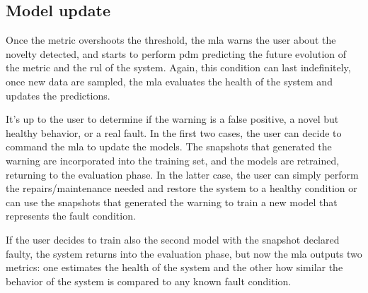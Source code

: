 \subsection{Model update}
Once the metric overshoots the threshold, the \gls{mla} warns the user about the novelty detected, and starts to perform \gls{pdm} predicting the future evolution of the metric and the \gls{rul} of the system. 
Again, this condition can last indefinitely, once new data are sampled, the \gls{mla} evaluates the health of the system and updates the predictions.

It's up to the user to determine if the warning is a false positive, a novel but healthy behavior, or a real fault. In the first two cases, the user can decide to command the \gls{mla} to update the models. The snapshots that generated the warning are incorporated into the training set, and the models are retrained, returning to the evaluation phase. In the latter case, the user can simply perform the repairs/maintenance needed and restore the system to a healthy condition or can use the snapshots that generated the warning to train a new model that represents the fault condition.

If the user decides to train also the second model with the snapshot declared faulty, the system returns into the evaluation phase, but now the \gls{mla} outputs two metrics: one estimates the health of the system and the other how similar the behavior of the system is compared to any known fault condition.

